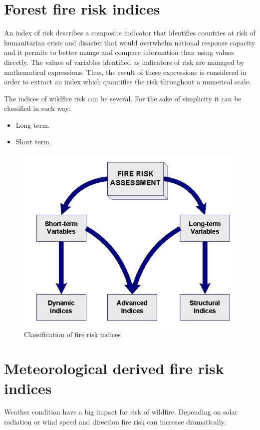 {{\section{Forest fire risk indices}
	An index of risk describes a composite indicator that identifies countries at risk of humanitarian crisis and disaster that would overwhelm national response capacity and it permits to better mange and compare information than using values directly. The values of variables identified as indicators of risk are managed by mathematical expressions. Thus, the result of these expressions is considered in order to extract an index which quantifies the risk throughout a numerical scale.
	
	The indices of wildfire risk can be several. For the sake of simplicity it can be classified in such way:
	
	\begin{itemize}
		\item Long term.
		\item Short term.
	\end{itemize}
	
	\begin{figure}[H]
		\centering
		\includegraphics[width=0.8\linewidth]{images/fire_risk_indices.png}
		\caption{Classification of fire risk indices}
		\label{fig:copernicus_hub}
	\end{figure}

\section{Meteorological derived fire risk indices}
	Weather condition have a big impact for risk of wildfire. Depending on solar radiation  or wind speed and direction fire risk can increase dramatically. 
	
}}
